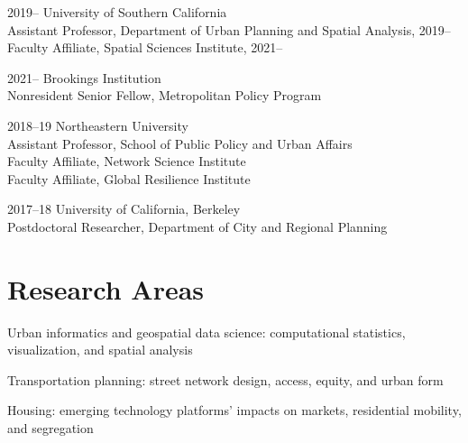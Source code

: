 \documentclass[11pt,letterpaper]{report}
\newcommand{\listitemspace}{0.25em}
\renewenvironment{itemize}
{\begin{list}{}{\setlength{\leftmargin}{0em}
                \setlength{\parskip}{0em}
                \setlength{\itemsep}{\listitemspace}
                \setlength{\parsep}{\listitemspace}}}
{\end{list}}
\begin{document}
    \begin{tablist}

        \item[2019--]   \tab{}University of Southern California \\
                              Assistant Professor, Department of Urban Planning and Spatial Analysis, 2019-- \\
                              Faculty Affiliate, Spatial Sciences Institute, 2021--

        \item[2021--]   \tab{}Brookings Institution \\
                              Nonresident Senior Fellow, Metropolitan Policy Program \\

        \item[2018--19] \tab{}Northeastern University \\
                              Assistant Professor, School of Public Policy and Urban Affairs \\
                              Faculty Affiliate, Network Science Institute \\
                              Faculty Affiliate, Global Resilience Institute

        \item[2017--18] \tab{}University of California, Berkeley \\
                              Postdoctoral Researcher, Department of City and Regional Planning

    \end{tablist}



    \section*{Research Areas}

    \begin{itemize}

        \item Urban informatics and geospatial data science: computational statistics, visualization, and spatial analysis
        \item Transportation planning: street network design, access, equity, and urban form
        \item Housing: emerging technology platforms' impacts on markets, residential mobility, and segregation

    \end{itemize}
\end{document}
